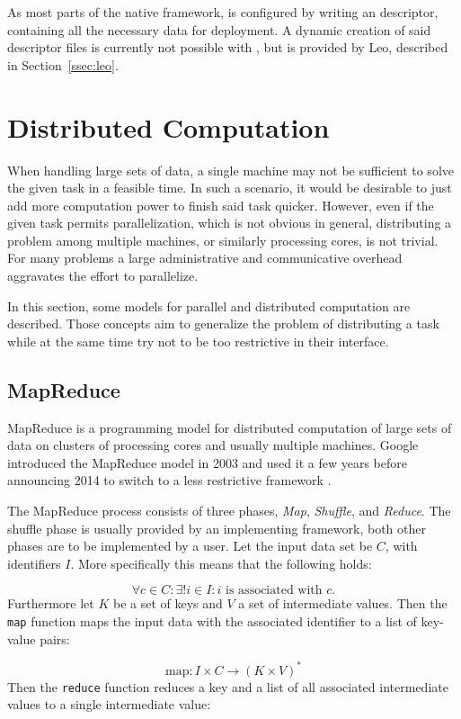 As most parts of the native \uima{} framework, \uimaas{} is configured by writing an \xml{} descriptor, containing all the necessary data for deployment. A dynamic creation of said descriptor files is currently not possible with \uimafit{}, but is provided by Leo, described in Section~\ref{ssec:leo}.

\section{Distributed Computation}
\label{sec:dist_comp}
When handling large sets of data, a single machine may not be sufficient to solve the given task in a feasible time. In such a scenario, it would be desirable to just add more computation power to finish said task quicker. However, even if the given task permits parallelization, which is not obvious in general, distributing a problem among multiple machines, or similarly processing cores, is not trivial. For many problems a large administrative and communicative overhead aggravates the effort to parallelize.

In this section, some models for parallel and distributed computation are described. Those concepts aim to generalize the problem of distributing a task while at the same time try not to be too restrictive in their interface. 

\subsection{MapReduce}
MapReduce is a programming model for distributed computation of large sets of data on clusters of processing cores and usually multiple machines. Google introduced the MapReduce model in 2003 and used it a few years before announcing 2014 to switch to a less restrictive framework \cite{dean2008mapreduce}.

The MapReduce process consists of three phases, \emph{Map}, \emph{Shuffle}, and \emph{Reduce}. The shuffle phase is usually provided by an implementing framework, both other phases are to be implemented by a user. Let the input data set be $C$, with identifiers $I$. More specifically this means that the following holds:

\[\forall{}c\in{}C:\exists!{}i\in{}I:i\text{ is associated with }c.\]
Furthermore let $K$ be a set of keys and $V$ a set of intermediate values. Then the \lstinline|map| function maps the input data with the associated identifier to a list of key-value pairs:

\[\text{map}:I\times{}C \rightarrow{} (K\times{}V)^*\]
Then the \lstinline|reduce| function reduces a key and a list of all associated intermediate values to a single intermediate value:

